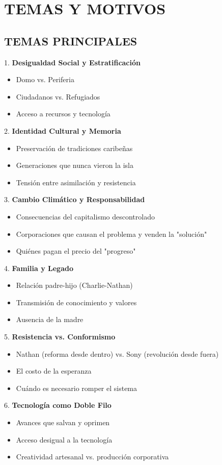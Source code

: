 \documentclass[11pt,a4paper]{report}
\begin{document}
\section{TEMAS Y MOTIVOS}

\subsection{TEMAS PRINCIPALES}

1. \textbf{Desigualdad Social y Estratificación}
\begin{itemize}
  \item Domo vs. Periferia
  \item Ciudadanos vs. Refugiados
  \item Acceso a recursos y tecnología

\end{itemize}
2. \textbf{Identidad Cultural y Memoria}
\begin{itemize}
  \item Preservación de tradiciones caribeñas
  \item Generaciones que nunca vieron la isla
  \item Tensión entre asimilación y resistencia

\end{itemize}
3. \textbf{Cambio Climático y Responsabilidad}
\begin{itemize}
  \item Consecuencias del capitalismo descontrolado
  \item Corporaciones que causan el problema y venden la "solución"
  \item Quiénes pagan el precio del "progreso"

\end{itemize}
4. \textbf{Familia y Legado}
\begin{itemize}
  \item Relación padre-hijo (Charlie-Nathan)
  \item Transmisión de conocimiento y valores
  \item Ausencia de la madre

\end{itemize}
5. \textbf{Resistencia vs. Conformismo}
\begin{itemize}
  \item Nathan (reforma desde dentro) vs. Sony (revolución desde fuera)
  \item El costo de la esperanza
  \item Cuándo es necesario romper el sistema

\end{itemize}
6. \textbf{Tecnología como Doble Filo}
\begin{itemize}
  \item Avances que salvan y oprimen
  \item Acceso desigual a la tecnología
  \item Creatividad artesanal vs. producción corporativa

\end{itemize}
\end{document}

